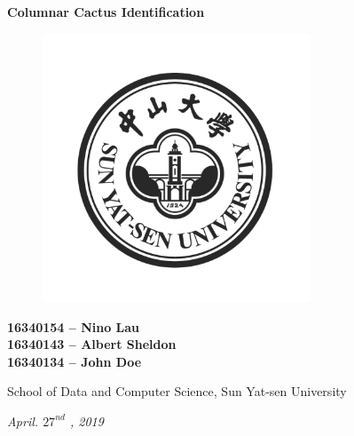 \documentclass[a4paper]{article}
\begin{document}
\vspace{6mm}
\begin{center}
\Huge\textbf{Columnar Cactus Identification}
\end{center}
\vspace{3mm}

\begin{figure}[H]
\centering
\includegraphics[width=8cm,height=8cm]{sysu.png}
\end{figure}

\begin{center}
\large\textbf{16340154 -- Nino Lau }\\
\vspace{2mm}
\large\textbf{16340143 -- Albert Sheldon }\\
\vspace{2mm}
\large\textbf{16340134 -- John Doe }\\
\end{center}

\begin{center}
\normalsize{School of Data and Computer Science, Sun Yat-sen University}
\end{center}

\begin{center}
\textit{April. $27^{nd}$ \textit, 2019\\}
\end{center}
\vspace{8mm}
\end{document}
